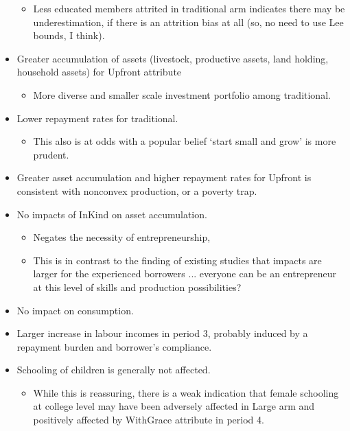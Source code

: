 \begin{mdframed}[style={SecItemize}, frametitle={Results}]
\begin{itemize}
\begin{itemize}
	\vspace{1.0ex}\setlength{\itemsep}{1.0ex}\setlength{\baselineskip}{12pt}
	\item	Less educated members attrited in traditional arm indicates there may be underestimation, if there is an attrition bias at all (so, no need to use Lee bounds, I think).
	\end{itemize}
\item	Greater accumulation of assets (livestock, productive assets, land holding, household assets) for \textsf{Upfront} attribute
	\begin{itemize}
	\vspace{1.0ex}\setlength{\itemsep}{1.0ex}\setlength{\baselineskip}{12pt}
	\item	More diverse and smaller scale investment portfolio among \textsf{traditional}. 
	\end{itemize}
\item	Lower repayment rates for \textsf{traditional}. 
	\begin{itemize}
	\vspace{1.0ex}\setlength{\itemsep}{1.0ex}\setlength{\baselineskip}{12pt}
	\item	This also is at odds with a popular belief `start small and grow' is more prudent.
	\end{itemize}
\item	Greater asset accumulation and higher repayment rates for \textsf{Upfront} is consistent with nonconvex production, or a poverty trap.
\item	No impacts of \textsf{InKind} on asset accumulation.
	\begin{itemize}
	\vspace{1.0ex}\setlength{\itemsep}{1.0ex}\setlength{\baselineskip}{12pt}
	\item	Negates the necessity of entrepreneurship, 
	\item	This is in contrast to the finding of existing studies that impacts are larger for the experienced borrowers ... everyone can be an entrepreneur at this level of skills and production possibilities? 
	\end{itemize}
\item	No impact on consumption. 
\item	Larger increase in labour incomes in period 3, probably induced by a repayment burden and borrower's compliance.
\item	Schooling of children is generally not affected.  
	\begin{itemize}
	\vspace{1.0ex}\setlength{\itemsep}{1.0ex}\setlength{\baselineskip}{12pt}
	\item	While this is reassuring, there is a weak indication that female schooling at college level may have been adversely affected in \textsf{Large} arm and positively affected by \textsf{WithGrace} attribute in period 4.
	\end{itemize}
\end{itemize}
\end{mdframed}


